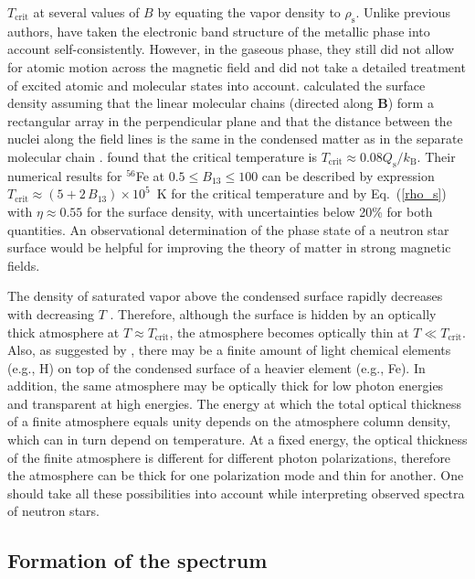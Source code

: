 \documentclass{aa}
\newcommand{\req}[1]{Eq.~(\ref{#1})}
\newcommand{\kB}{k_\mathrm{B}}
\begin{document}
$T_\mathrm{crit}$ at several values of $B$ by equating the
vapor density to $\rho_\mathrm{s}$. Unlike previous
authors, \citet{MedinLai06,MedinLai07} have taken the
electronic band structure of the metallic phase into account
self-consistently. However, in the gaseous phase, they
still did not allow for atomic motion across the magnetic
field and did not take a detailed treatment 
of excited atomic
and molecular states into account. \citet{MedinLai07} calculated the
surface density assuming that the linear molecular chains
(directed along $\bm{B}$) form a rectangular array in the
perpendicular plane and that the distance between the nuclei
along the field lines is the same in the condensed matter
as in the separate molecular chain
\citep{MedinLai06,Medin12}. \citet{MedinLai07} found that
the critical temperature is $T_\mathrm{crit}\approx0.08
Q_\mathrm{s}/\kB$. Their numerical results for  $^{56}$Fe at
$0.5\leqslant B_{13} \leqslant 100$ can be described by expression 
$T_\mathrm{crit} \approx (5+2\,B_{13})\times10^5$~K for the
critical temperature and by \req{rho_s} with $\eta\approx0.55$ for
the surface density, with uncertainties below 20\% for both
quantities. 
  An observational determination of the phase state of a
neutron star surface would be helpful for improving the
theory of matter  in strong magnetic fields.

The density of saturated vapor above the condensed surface
rapidly decreases with decreasing $T$ \citep{LaiSalpeter97}.
Therefore, although the surface is hidden by an optically
thick atmosphere at $T\approx T_\mathrm{crit}$, the
atmosphere becomes optically thin at $T\ll T_\mathrm{crit}$.
Also, as  suggested by \citet{MotchZH03}, there may be a
finite amount of light chemical elements (e.g., H) on top of
the condensed surface of a heavier element (e.g., Fe). In
addition,  the same atmosphere may be optically thick for
low photon energies and transparent at high energies. The
energy at which the total optical thickness of a finite
atmosphere equals unity depends on the atmosphere column
density, which can in turn depend on temperature. At a fixed
energy, the optical thickness of the finite atmosphere is
different for different photon polarizations, therefore the
atmosphere can be thick for one polarization mode and thin
for another. One should take all these possibilities into
account while interpreting observed spectra of neutron
stars.

\subsection{Formation of the spectrum}
\label{sect:Formation}
\end{document}
